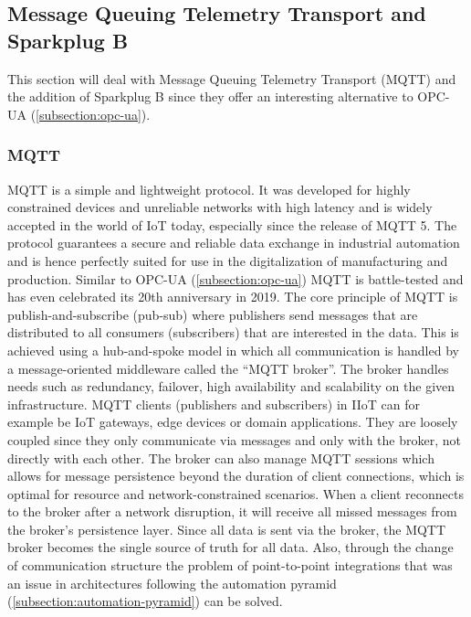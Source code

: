 \newpage
\subsection{Message Queuing Telemetry Transport and Sparkplug B}
    This section will deal with Message Queuing Telemetry Transport (MQTT) and the addition of Sparkplug B since they offer an interesting alternative to OPC-UA (\autoref{subsection:opc-ua}).

    \subsubsection{MQTT}
    \label{subsubsection:mqtt}
        
        MQTT is a simple and lightweight protocol. It was developed for highly constrained devices and unreliable networks with high latency and is widely accepted in the world of IoT today, especially since the release of MQTT 5. The protocol guarantees a secure and reliable data exchange in industrial automation and is hence perfectly suited for use in the digitalization of manufacturing and production. Similar to OPC-UA (\autoref{subsection:opc-ua}) MQTT is battle-tested and has even celebrated its 20th anniversary in 2019. The core principle of MQTT is publish-and-subscribe (pub-sub) where publishers send messages that are distributed to all consumers (subscribers) that are interested in the data. This is achieved using a hub-and-spoke model in which all communication is handled by a message-oriented middleware called the ``MQTT broker''. The broker handles needs such as redundancy, failover, high availability and scalability on the given infrastructure. MQTT clients (publishers and subscribers) in IIoT can for example be IoT gateways, edge devices or domain applications. They are loosely coupled since they only communicate via messages and only with the broker, not directly with each other. The broker can also manage MQTT sessions which allows for message persistence beyond the duration of client connections, which is optimal for resource and network-constrained scenarios. When a client reconnects to the broker after a network disruption, it will receive all missed messages from the broker's persistence layer. Since all data is sent via the broker, the MQTT broker becomes the single source of truth for all data. Also, through the change of communication structure the problem of point-to-point integrations that was an issue in architectures following the automation pyramid (\autoref{subsection:automation-pyramid}) can be solved. \newline
        
